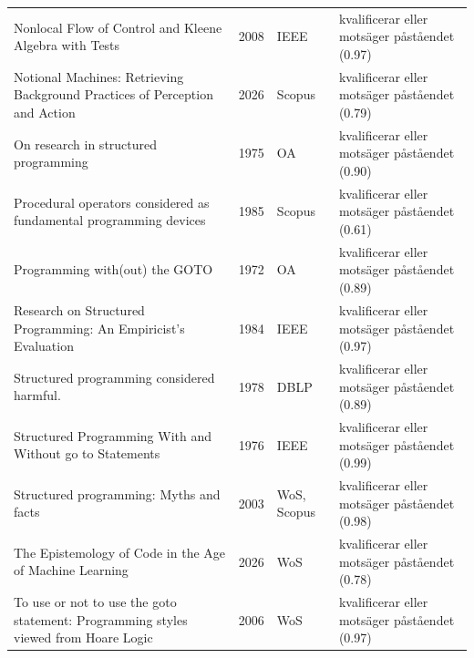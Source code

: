 \begin{longtable}{@{}%
  >{\raggedright\arraybackslash}p{}c%
  >{\raggedright\arraybackslash}p{}%
  >{\raggedright\arraybackslash}p{}@{}}
Nonlocal Flow of Control and Kleene Algebra with Tests & 2008 & IEEE & kvalificerar eller motsäger påståendet (0.97) \\
Notional Machines: Retrieving Background Practices of Perception and Action & 2026 & Scopus & kvalificerar eller motsäger påståendet (0.79) \\
On research in structured programming & 1975 & OA & kvalificerar eller motsäger påståendet (0.90) \\
Procedural operators considered as fundamental programming devices & 1985 & Scopus & kvalificerar eller motsäger påståendet (0.61) \\
Programming with(out) the GOTO & 1972 & OA & kvalificerar eller motsäger påståendet (0.89) \\
Research on Structured Programming: An Empiricist's Evaluation & 1984 & IEEE & kvalificerar eller motsäger påståendet (0.97) \\
Structured programming considered harmful. & 1978 & DBLP & kvalificerar eller motsäger påståendet (0.89) \\
Structured Programming With and Without go to Statements & 1976 & IEEE & kvalificerar eller motsäger påståendet (0.99) \\
Structured programming: Myths and facts & 2003 & WoS, Scopus & kvalificerar eller motsäger påståendet (0.98) \\
The Epistemology of Code in the Age of Machine Learning & 2026 & WoS & kvalificerar eller motsäger påståendet (0.78) \\
To use or not to use the goto statement: Programming styles viewed from Hoare Logic & 2006 & WoS & kvalificerar eller motsäger påståendet (0.97) \\
\end{longtable}
\endgroup
